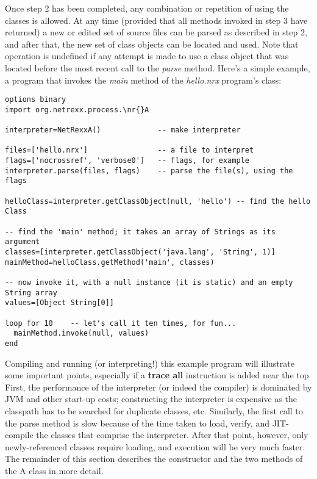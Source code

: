 Once step 2 has been completed, any combination or repetition of using
the classes is allowed.  At any time (provided that all methods invoked
in step 3 have returned) a new or edited set of source files can be
parsed as described in step 2, and after that, the new set of class
objects can be located and used.  Note that operation is undefined if
any attempt is made to use a class object that was located before the
most recent call to the \emph{parse} method.
\newline
Here's a simple example, a program that invokes the \emph{main} method
of the \emph{hello.nrx} program's class:
\begin{lstlisting}[label=netrexxa,caption=Try the \nr{}A interface]
options binary
import org.netrexx.process.\nr{}A

interpreter=NetRexxA()             -- make interpreter

files=['hello.nrx']                -- a file to interpret
flags=['nocrossref', 'verbose0']   -- flags, for example
interpreter.parse(files, flags)    -- parse the file(s), using the flags

helloClass=interpreter.getClassObject(null, 'hello') -- find the hello Class

-- find the 'main' method; it takes an array of Strings as its argument
classes=[interpreter.getClassObject('java.lang', 'String', 1)]
mainMethod=helloClass.getMethod('main', classes)

-- now invoke it, with a null instance (it is static) and an empty String array
values=[Object String[0]]

loop for 10    -- let's call it ten times, for fun...
  mainMethod.invoke(null, values)
end
\end{lstlisting}

Compiling and running (or interpreting!) this example program will
illustrate some important points, especially if a \textbf{trace all}
instruction is added near the top.  First, the performance of the
interpreter (or indeed the compiler) is dominated by JVM and other
start-up costs; constructing the interpreter is expensive as the
classpath has to be searched for duplicate classes, etc.  Similarly,
the first call to the parse method is slow because of the time taken to
load, verify, and JIT-compile the classes that comprise the interpreter.
After that point, however, only newly-referenced classes require
loading, and execution will be very much faster.
\newline
The remainder of this section describes the constructor and the two
methods of the \nr{}A class in more detail.
